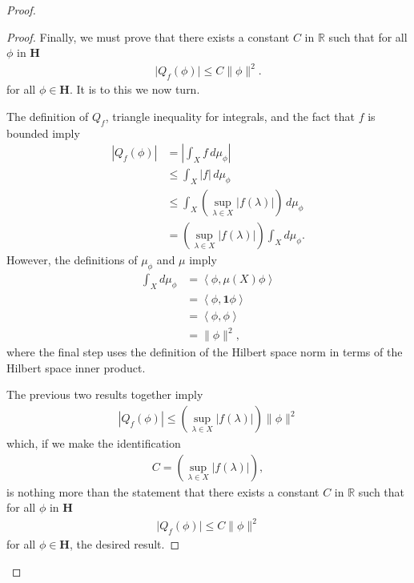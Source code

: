 \begin{proof}
\begin{proof}
Finally, we must prove that there exists a constant $C$ in $\mathbb{R}$ such that for all $\phi$ in $\mathbf{H}$
\begin{align}
    \lvert Q_f(\phi) \rvert \le C \|\phi\|^2.
\end{align}
for all $\phi \in \mathbf{H}$. It is to this we now turn.

The definition of $Q_f$, triangle inequality for integrals, and the fact that $f$ is bounded imply
\begin{align}
    \left\lvert Q_f(\phi) \right\rvert &= \left\lvert \int_X f \, d\mu_\phi \right\rvert \\
                             &\le \int_X \left\lvert f \right\rvert \, d\mu_\phi \\
                             &\le \int_X \left(  \sup\limits_{\lambda \in X} \left\lvert f(\lambda) \right\rvert \right) \, d\mu_\phi \\
                             &= \left( \sup\limits_{\lambda \in X} \left\lvert f(\lambda) \right\rvert \right) \int_X d\mu_\phi.
\end{align}
However, the definitions of $\mu_\phi$ and $\mu$ imply
\begin{align}
    \int_X d\mu_\phi &= \left< \phi, \mu(X) \phi \right> \\
                     &= \left< \phi, \mathbf{1} \phi \right> \\
                     &= \left< \phi, \phi \right> \\
                     &= \| \phi \|^2,
\end{align}
where the final step uses the definition of the Hilbert space norm in terms of the Hilbert space inner product.

The previous two results together imply
\begin{align}
    \left\lvert Q_f(\phi) \right\rvert \le \left( \sup\limits_{\lambda \in X} \left\lvert f(\lambda) \right\rvert \right) \| \phi \|^2
\end{align}
which, if we make the identification
\begin{align}
    C = \left( \sup\limits_{\lambda \in X} \left\lvert f(\lambda) \right\rvert \right),
\end{align}
is nothing more than the statement that there exists a constant $C$ in $\mathbb{R}$ such that for all $\phi$ in $\mathbf{H}$
\begin{align}
    \lvert Q_f(\phi) \rvert \le C \|\phi\|^2
\end{align}
for all $\phi \in \mathbf{H}$, the desired result.


\end{proof}
\end{proof}
